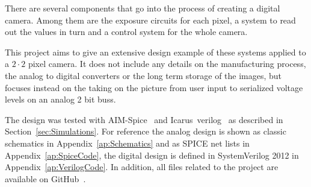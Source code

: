 
There are several components that go into the process of creating a digital camera.
Among them are the exposure circuits for each pixel, a system to read out the values in turn
and a control system for the whole camera.

This project aims to give an extensive design example of these systems applied to a $2 \cdot 2$ pixel camera.
It does not include any details on the manufacturing process, the analog to digital converters or the long term storage of the images, but focuses instead
on the taking on the picture from user input to serialized voltage levels on an analog 2 bit buss.

The design was tested with AIM-Spice~\cite{AIMSpice} and Icarus~verilog~\cite{icarusVL} as described in Section~\ref{sec:Simulations}.
For reference the analog design is shown as classic schematics in Appendix~\ref{ap:Schematics} and as SPICE net lists in Appendix~\ref{ap:SpiceCode}, the digital design is defined in SystemVerilog 2012 in Appendix~\ref{ap:VerilogCode}.
In addition, all files related to the project are available on GitHub~\cite{githubProject}.